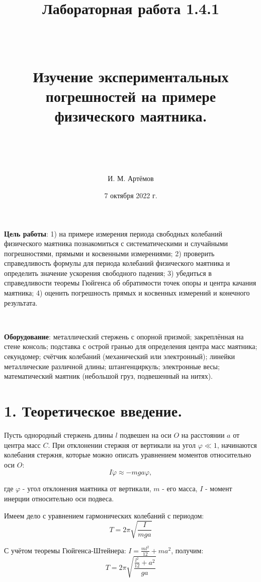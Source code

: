 \documentclass[a4paper]{article}
\begin{document}
\title{\textbf{Лабораторная работа 1.4.1}

\

Изучение экспериментальных погрешностей на примере физического маятника.

\
}
\author{И. М. Артёмов}
\date{7 октября 2022 г.}
\maketitle
\noindent
\textbf{Цель работы}: 1) на примере измерения периода свободных колебаний физического маятника познакомиться с систематическими и случайными погрешностями, прямыми и косвенными измерениями; 2) проверить справедливость формулы для периода колебаний физического маятника и определить значение ускорения свободного падения; 3) убедиться в справедливости теоремы Гюйгенса об обратимости точек опоры и центра качания маятника; 4) оценить погрешность прямых и косвенных измерений и конечного результата.

\

\noindent
\textbf{Оборудование}: 	металлический стержень с опорной призмой; закреплённая на стене консоль; подставка с острой гранью для определения центра масс маятника; секундомер; счётчик колебаний (механический или электронный); линейки металлические различной длины; штангенциркуль; электронные весы; математический маятник (небольшой груз, подвешенный на нитях).

\section*{\textbf{1. Теоретическое введение.}}

Пусть однородный стержень длины $l$ подвешен на оси $O$ на расстоянии $a$ от центра масс $C$. При отклонении стержня от вертикали на угол $\varphi \ll 1$, начинаются колебания стержня, которые можно описать уравнением моментов относительно оси $O$:
\begin{equation}
I \ddot{\varphi} \approx - m g a \varphi,
\end{equation}

\noindent
где $\varphi$ - угол отклонения маятника от вертикали, $m$ - его масса, $I$ - момент инерции относительно оси подвеса.

\noindent
Имеем дело с уравнением гармонических колебаний с периодом:
\begin{equation}
T = 2\pi \sqrt{\frac{I}{mga}}
\end{equation}

\noindent
С учётом теоремы Гюйгенса-Штейнера: $I = \frac{ml^2}{12} + m a^2$, получим:
\begin{equation}\label{eq3}
T = 2\pi \sqrt{\frac{\frac{l^2}{12} + a^2}{g a}}
\end{equation}
\end{document}
